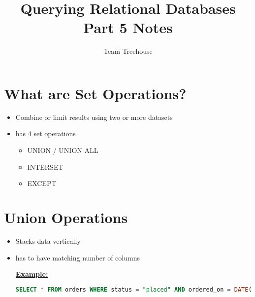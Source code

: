 \documentclass[12pt]{article}
\begin{document}
\title{Querying Relational Databases Part 5 Notes}
\author{Team Treehouse}
\maketitle

\bigskip

\section{What are Set Operations?}

\bigskip

\begin{itemize}
    \item Combine or limit results using two or more datasets
    \item has 4 set operations
    \begin{itemize}
        \item UNION / UNION ALL
        \item INTERSET
        \item EXCEPT
    \end{itemize}
\end{itemize}

\bigskip

\section{Union Operations}

\bigskip

\begin{itemize}
    \item Stacks data vertically
    \item has to have matching number of columns

    \bigskip

    \underline{\textbf{Example:}}

    \bigskip

    \begin{lstlisting}[language=SQL]
    SELECT * FROM orders WHERE status = "placed" AND ordered_on = DATE("now");
    \end{lstlisting}
\end{itemize}
\end{document}

